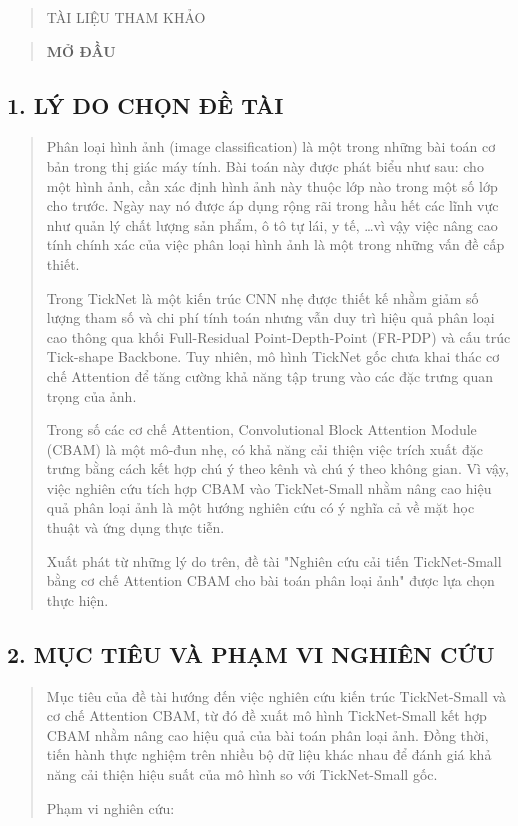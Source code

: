 \documentclass[
]{article}
\begin{document}
\begin{quote}
TÀI LIỆU THAM KHẢO
\end{quote}

\begin{quote}
\textbf{MỞ ĐẦU}
\end{quote}

\subsection{1. LÝ DO CHỌN ĐỀ TÀI}\label{1-ly-do-chon-de-tai}

\begin{quote}
Phân loại hình ảnh (image classification) là một trong những bài toán cơ
bản trong thị giác máy tính. Bài toán này được phát biểu như sau: cho
một hình ảnh, cần xác định hình ảnh này thuộc lớp nào trong một số lớp
cho trước. Ngày nay nó được áp dụng rộng rãi trong hầu hết các lĩnh vực
như quản lý chất lượng sản phẩm, ô tô tự lái, y tế, \ldots vì vậy việc
nâng cao tính chính xác của việc phân loại hình ảnh là một trong những
vấn đề cấp thiết.

Trong TickNet là một kiến trúc CNN nhẹ được thiết kế nhằm giảm số lượng
tham số và chi phí tính toán nhưng vẫn duy trì hiệu quả phân loại cao
thông qua khối Full-Residual Point-Depth-Point (FR-PDP) và cấu trúc
Tick-shape Backbone. Tuy nhiên, mô hình TickNet gốc chưa khai thác cơ
chế Attention để tăng cường khả năng tập trung vào các đặc trưng quan
trọng của ảnh.

Trong số các cơ chế Attention, Convolutional Block Attention Module
(CBAM) là một mô-đun nhẹ, có khả năng cải thiện việc trích xuất đặc
trưng bằng cách kết hợp chú ý theo kênh và chú ý theo không gian. Vì
vậy, việc nghiên cứu tích hợp CBAM vào TickNet-Small nhằm nâng cao hiệu
quả phân loại ảnh là một hướng nghiên cứu có ý nghĩa cả về mặt học thuật
và ứng dụng thực tiễn.

Xuất phát từ những lý do trên, đề tài "Nghiên cứu cải tiến TickNet-Small
bằng cơ chế Attention CBAM cho bài toán phân loại ảnh" được lựa chọn
thực hiện.
\end{quote}

\subsection{2. MỤC TIÊU VÀ PHẠM VI NGHIÊN CỨU}\label{2-muc-tieu-va-pham-vi-nghien-cuu}

\begin{quote}
Mục tiêu của đề tài hướng đến việc nghiên cứu kiến trúc TickNet-Small và
cơ chế Attention CBAM, từ đó đề xuất mô hình TickNet-Small kết hợp CBAM
nhằm nâng cao hiệu quả của bài toán phân loại ảnh. Đồng thời, tiến hành
thực nghiệm trên nhiều bộ dữ liệu khác nhau để đánh giá khả năng cải
thiện hiệu suất của mô hình so với TickNet-Small gốc.

Phạm vi nghiên cứu:
\end{quote}
\end{document}

